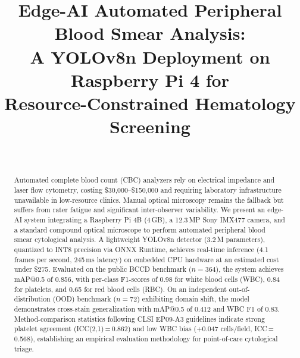 \documentclass[10pt,conference]{IEEEtran}
\begin{document}
\title{%
  Edge-AI Automated Peripheral Blood Smear Analysis:\\
  A YOLOv8n Deployment on Raspberry Pi 4 for\\
  Resource-Constrained Hematology Screening%
}

\author{%
  \\
}

\maketitle
\IEEEpeerreviewmaketitle

\begin{abstract}
Automated complete blood count (CBC) analyzers rely on electrical impedance and laser flow cytometry, costing \$30,000–\$150,000 and requiring laboratory infrastructure unavailable in low-resource clinics. Manual optical microscopy remains the fallback but suffers from rater fatigue and significant inter-observer variability. We present an edge-AI system integrating a Raspberry Pi 4B (4\,GB), a 12.3\,MP Sony IMX477 camera, and a standard compound optical microscope to perform automated peripheral blood smear cytological analysis. A lightweight YOLOv8n detector (3.2\,M parameters), quantized to INT8 precision via ONNX Runtime, achieves real-time inference (4.1 frames per second, 245\,ms latency) on embedded CPU hardware at an estimated cost under \$275. Evaluated on the public BCCD benchmark ($n=364$), the system achieves mAP@0.5 of 0.856, with per-class F1-scores of 0.98 for white blood cells (WBC), 0.84 for platelets, and 0.65 for red blood cells (RBC). On an independent out-of-distribution (OOD) benchmark ($n=72$) exhibiting domain shift, the model demonstrates cross-stain generalization with mAP@0.5 of 0.412 and WBC F1 of 0.83. Method-comparison statistics following CLSI EP09-A3 guidelines indicate strong platelet agreement (ICC(2,1)\,=\,0.862) and low WBC bias (+0.047 cells/field, ICC\,=\,0.568), establishing an empirical evaluation methodology for point-of-care cytological triage.
\end{abstract}
\end{document}
